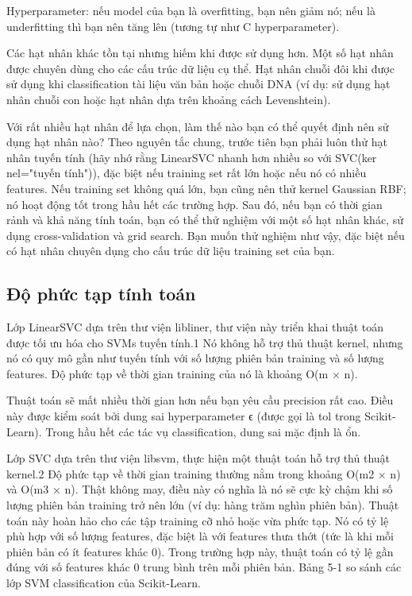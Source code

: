 Hyperparameter: nếu model của bạn là overfitting, bạn nên giảm nó; nếu là underfitting thì bạn nên tăng lên (tương tự như C hyperparameter).

Các hạt nhân khác tồn tại nhưng hiếm khi được sử dụng hơn. Một số hạt nhân được chuyên dùng cho các cấu trúc dữ liệu cụ thể. Hạt nhân chuỗi đôi khi được sử dụng khi classification tài liệu văn bản hoặc chuỗi DNA (ví dụ: sử dụng hạt nhân chuỗi con hoặc hạt nhân dựa trên khoảng cách Levenshtein).

Với rất nhiều hạt nhân để lựa chọn, làm thế nào bạn có thể quyết định nên sử dụng hạt nhân nào? Theo nguyên tắc chung, trước tiên bạn phải luôn thử hạt nhân tuyến tính (hãy nhớ rằng LinearSVC nhanh hơn nhiều so với SVC(ker nel="tuyến tính")), đặc biệt nếu training set rất lớn hoặc nếu nó có nhiều features. Nếu training set không quá lớn, bạn cũng nên thử kernel Gaussian RBF; nó hoạt động tốt trong hầu hết các trường hợp. Sau đó, nếu bạn có thời gian rảnh và khả năng tính toán, bạn có thể thử nghiệm với một số hạt nhân khác, sử dụng cross-validation và grid search. Bạn muốn thử nghiệm như vậy, đặc biệt nếu có hạt nhân chuyên dụng cho cấu trúc dữ liệu training set của bạn.

\subsection{Độ phức tạp tính toán}

Lớp LinearSVC dựa trên thư viện libliner, thư viện này triển khai thuật toán được tối ưu hóa cho SVMs tuyến tính.1 Nó không hỗ trợ thủ thuật kernel, nhưng nó có quy mô gần như tuyến tính với số lượng phiên bản training và số lượng features. Độ phức tạp về thời gian training của nó là khoảng O(m × n).

Thuật toán sẽ mất nhiều thời gian hơn nếu bạn yêu cầu precision rất cao. Điều này được kiểm soát bởi dung sai hyperparameter ϵ (được gọi là tol trong Scikit-Learn). Trong hầu hết các tác vụ classification, dung sai mặc định là ổn.

Lớp SVC dựa trên thư viện libsvm, thực hiện một thuật toán hỗ trợ thủ thuật kernel.2 Độ phức tạp về thời gian training thường nằm trong khoảng O(m2 × n) và O(m3 × n). Thật không may, điều này có nghĩa là nó sẽ cực kỳ chậm khi số lượng phiên bản training trở nên lớn (ví dụ: hàng trăm nghìn phiên bản). Thuật toán này hoàn hảo cho các tập training cỡ nhỏ hoặc vừa phức tạp. Nó có tỷ lệ phù hợp với số lượng features, đặc biệt là với features thưa thớt (tức là khi mỗi phiên bản có ít features khác 0). Trong trường hợp này, thuật toán có tỷ lệ gần đúng với số features khác 0 trung bình trên mỗi phiên bản. Bảng 5-1 so sánh các lớp SVM classification của Scikit-Learn.

